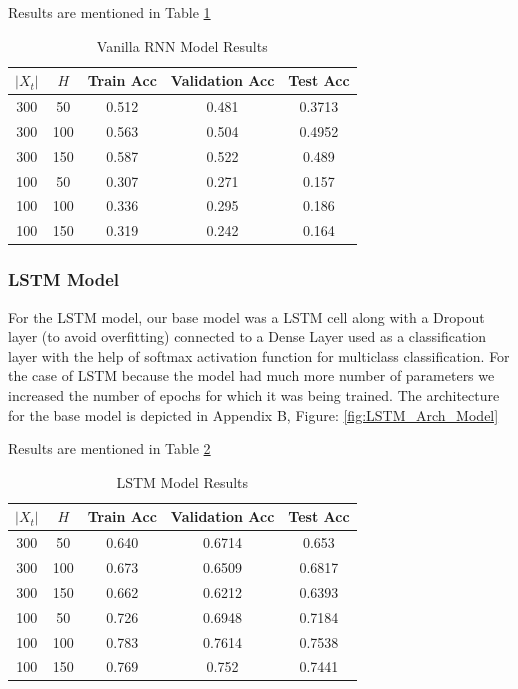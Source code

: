 \documentclass[letterpaper, 12 pt, conference]{ieeeconf}  %
\begin{document}
Results are mentioned in Table \ref{tab:RNN_Acc}

\begin{table}[!h]
\centering
\caption{Vanilla RNN Model Results}
\begin{tabular}{| c || c || c || c || c |} %
\hline %
 $|X_t|$ & $H$ & Train Acc & Validation Acc & Test Acc\\
   \hline \hline
300 & 50 & 0.512 & 0.481 & 0.3713 \\
\hline
300 & 100 & 0.563 & 0.504 & 0.4952 \\
\hline
300 & 150 & 0.587 & 0.522 & 0.489 \\	
\hline
100 & 50 & 0.307 & 0.271 & 0.157 \\
\hline
100 & 100 & 0.336 & 0.295 & 0.186 \\
\hline
100 & 150 & 0.319 & 0.242 & 0.164 \\
\hline
   \end{tabular}
\label{tab:RNN_Acc} 
\end{table}


\subsubsection{LSTM Model}
For the LSTM model, our base model was a LSTM cell along with a Dropout layer (to avoid overfitting) connected to a Dense Layer used as a classification layer with the help of softmax activation function for multiclass classification. For the case of LSTM because the model had much more number of parameters we increased the number of epochs for which it was being trained. The architecture for the base model is depicted in Appendix B, Figure: \ref{fig:LSTM_Arch_Model}

Results are mentioned in Table \ref{tab:LSTM_Acc}

\begin{table}[!h]
\centering
\caption{LSTM Model Results}
\begin{tabular}{| c || c || c || c || c |} %
\hline %
 $|X_t|$ & $H$ & Train Acc & Validation Acc & Test Acc\\
   \hline \hline
300 & 50 & 0.640 & 0.6714 & 0.653 \\
\hline
300 & 100 & 0.673 & 0.6509 & 0.6817 \\
\hline
300 & 150 & 0.662 & 0.6212 & 0.6393 \\	
\hline
100 & 50 & 0.726 & 0.6948 & 0.7184 \\
\hline
100 & 100 & 0.783 & 0.7614 & 0.7538 \\
\hline
100 & 150 & 0.769 & 0.752 & 0.7441 \\
\hline
   \end{tabular}
\label{tab:LSTM_Acc} 
\end{table}
\end{document}
